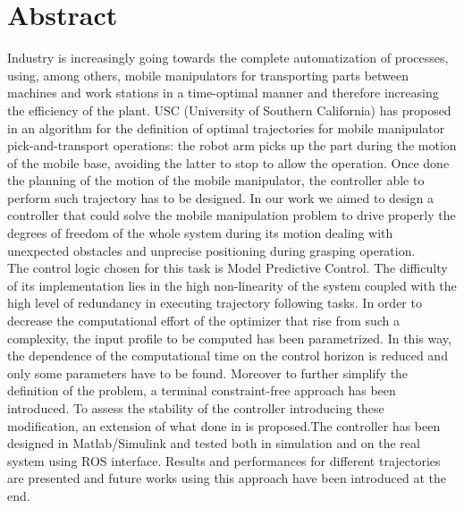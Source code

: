 	\newpage
\chapter*{Abstract}

Industry is increasingly going towards the complete automatization of processes, using, among others, mobile manipulators for transporting parts between machines and work stations in a time-optimal manner and therefore increasing the efficiency of the plant. 
USC (University of Southern California) has proposed in \cite{shantanuthakar} an algorithm for the definition of optimal trajectories for mobile manipulator pick-and-transport operations: the robot arm picks up the part during the motion of the mobile base, avoiding the latter to stop to allow the operation.
Once done the planning of the motion of the mobile manipulator, the controller able to perform such trajectory has to be designed. In our work we aimed to design a controller that could solve the mobile manipulation problem to drive properly the degrees of freedom of the whole system during its motion dealing with unexpected obstacles and unprecise positioning during grasping operation.\\
The control logic chosen for this task is Model Predictive Control. The difficulty of its implementation lies in the high non-linearity of the system coupled with the high level of redundancy in executing trajectory following tasks. In order to decrease the computational effort of the optimizer that rise from such a complexity, the input profile to be computed has been parametrized. In this way, the dependence of the computational time on the control horizon is reduced and only some parameters have to be found. Moreover to further simplify the definition of the problem, a terminal constraint-free approach has been introduced. To assess the stability of the controller introducing these modification, an extension of what done in \cite{alamir2018stability} is proposed.The controller has been designed in Matlab/Simulink and tested both in simulation and on the real system using ROS interface. Results and performances for different trajectories are presented and future works using this approach have been introduced at the end.  

\vspace{0.5cm}
\noindent 
